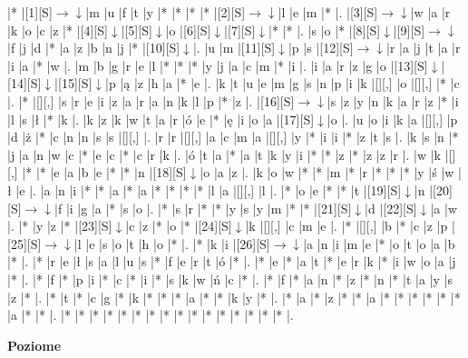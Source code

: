 \documentclass[11pt]{article}
\newcommand\drarr{$\rightarrow \!\!\!\!\! \downarrow$}
\newcommand\darr{$\downarrow$}
\begin{document}
\noindent\begin{Puzzle}{15}{28}|*	|[1][S]\drarr	|m	|u	|f	|t	|y	|*	|*	|*	|*	|[2][S]\drarr	|l	|e	|m	|*	|.
|[3][S]\drarr	|w	|a	|r	|k	|o	|c	|z	|*	|[4][S]\darr	|[5][S]\darr	|o	|[6][S]\darr	|[7][S]\darr	|*	|*	|.
|s	|o	|*	|[8][S]\darr	|[9][S]\drarr	|f	|j	|d	|*	|a	|z	|b	|n	|j	|*	|[10][S]\darr	|.
|u	|m	|[11][S]\darr	|p	|s	|[12][S]\drarr	|r	|a	|j	|t	|a	|r	|i	|a	|*	|w	|.
|m	|b	|g	|r	|e	|l	|*	|*	|*	|y	|j	|a	|c	|m	|*	|i	|.
|i	|a	|r	|z	|g	|o	|[13][S]\darr	|[14][S]\darr	|[15][S]\darr	|p	|ą	|z	|h	|a	|*	|e	|.
|k	|t	|u	|e	|m	|g	|s	|n	|p	|i	|k	|[][,]{ }	|o	|[][,]{ }	|*	|c	|.
|*	|[][,]{ }	|s	|r	|e	|i	|z	|a	|r	|a	|n	|k	|l	|p	|*	|z	|.
|[16][S]\drarr	|s	|z	|y	|n	|k	|a	|r	|z	|*	|i	|l	|s	|ł	|*	|k	|.
|k	|z	|k	|w	|t	|a	|r	|ó	|e	|*	|ę	|i	|o	|a	|[17][S]\darr	|o	|.
|u	|o	|i	|k	|a	|[][,]{ }	|p	|d	|ż	|*	|c	|n	|n	|s	|s	|[][,]{ }	|.
|r	|r	|[][,]{ }	|a	|c	|m	|a	|[][,]{ }	|y	|*	|i	|i	|*	|z	|t	|s	|.
|k	|s	|n	|*	|j	|a	|n	|w	|c	|*	|e	|c	|*	|c	|r	|k	|.
|ó	|t	|a	|*	|a	|t	|k	|y	|i	|*	|*	|z	|*	|z	|z	|r	|.
|w	|k	|[][,]{ }	|*	|*	|e	|a	|b	|e	|*	|*	|n	|[18][S]\darr	|o	|a	|z	|.
|k	|o	|w	|*	|*	|m	|*	|r	|*	|*	|*	|y	|ś	|w	|ł	|e	|.
|a	|n	|i	|*	|*	|a	|*	|a	|*	|*	|*	|*	|l	|a	|[][,]{ }	|l	|.
|*	|o	|e	|*	|*	|t	|[19][S]\darr	|n	|[20][S]\drarr	|f	|i	|g	|a	|*	|s	|o	|.
|*	|s	|r	|*	|*	|y	|s	|y	|m	|*	|*	|[21][S]\darr	|d	|[22][S]\darr	|a	|w	|.
|*	|y	|z	|*	|[23][S]\darr	|c	|z	|*	|o	|*	|[24][S]\darr	|k	|[][,]{ }	|c	|m	|e	|.
|*	|[][,]{ }	|b	|*	|c	|z	|p	|[25][S]\drarr	|l	|e	|s	|o	|t	|h	|o	|*	|.
|*	|k	|i	|[26][S]\drarr	|a	|n	|i	|m	|e	|*	|o	|t	|o	|a	|b	|*	|.
|*	|r	|e	|ł	|s	|a	|l	|u	|s	|*	|f	|e	|r	|t	|ó	|*	|.
|*	|e	|*	|a	|t	|*	|e	|r	|k	|*	|i	|w	|o	|a	|j	|*	|.
|*	|f	|*	|p	|i	|*	|c	|*	|i	|*	|s	|k	|w	|ń	|c	|*	|.
|*	|f	|*	|a	|n	|*	|z	|*	|n	|*	|t	|a	|y	|s	|z	|*	|.
|*	|t	|*	|c	|g	|*	|k	|*	|*	|*	|a	|*	|*	|k	|y	|*	|.
|*	|a	|*	|z	|*	|*	|a	|*	|*	|*	|*	|*	|*	|a	|*	|*	|.
|*	|*	|*	|*	|*	|*	|*	|*	|*	|*	|*	|*	|*	|*	|*	|*	|.\end{Puzzle}

\newpage

\begin{PuzzleClues}{\textbf{Poziome}\\}
\end{PuzzleClues}
\end{document}

